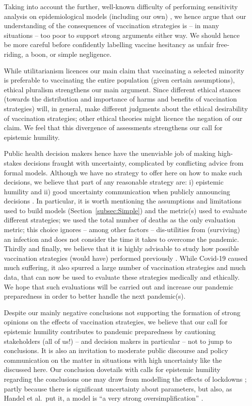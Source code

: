 \documentclass[a4paper,12pt]{article}
\begin{document}
Taking into account the further, well-known difficulty of performing sensitivity analysis on epidemiological models (including our own) \cite{Edeling2021}, we hence argue that our understanding of the consequences of vaccination strategies is -- in many situations -- too poor to support strong arguments either way. We should hence be more careful before confidently labelling vaccine hesitancy as unfair free-riding, a boon, or simple negligence. 

While utilitarianism licences our main claim that vaccinating a selected minority is preferable to vaccinating the entire population (given certain assumptions), ethical pluralism strengthens our main argument. Since different ethical stances (towards the distribution and importance of harms and benefits of vaccination strategies) will, in general, make different judgments about the ethical desirability of vaccination strategies; other ethical theories might licence the negation of our claim. We feel that this divergence of assessments strengthens our call for epistemic humility.

Public health decision makers hence have the unenviable job of making high-stakes decisions fraught with uncertainty, complicated by conflicting advice from formal models. Although we have no strategy to offer here on how to make such decisions, we believe that part of any reasonable strategy are: i) epistemic humility and ii) good uncertainty communication when publicly announcing decisions \cite{Nutbeam2020,Intemann2023,Nguyen2024,Friedman2023,OjeaQuintana2021}. In particular, it is worth mentioning the assumptions and limitations used to build models (Section~\ref{subsec:Simple}) and the metric(s) used to evaluate different strategies; we used the total number of deaths as the only evaluation metric; this choice ignores -- among other factors -- dis-utilities from (surviving) an infection and does not consider the time it takes to overcome the pandemic. Thirdly and finally, we believe that it is highly advisable to study how possible vaccination strategies (would have) performed previously \cite{Thompson2013}. While Covid-19 caused much suffering, it also spurred a large number of vaccination strategies and much data, that can now be used to evaluate these strategies medically and ethically. We hope that such evaluations will be carried out and increase our pandemic preparedness in order to better handle the next pandemic(s).

Despite our mainly negative conclusions not supporting the formation of strong opinions on the effects of vaccination strategies, we believe that our call for epistemic humility contributes to pandemic preparedness by cautioning stakeholders (all of us!) -- and decision makers in particular -- not to jump to conclusions. It is also an invitation to moderate public discourse and policy communication on the matter in situations with high uncertainty like the discussed here. Our conclusion dovetails with calls for epistemic humility regarding the conclusions one may draw from modelling the effects of lockdowns \cite[Chapter~3]{Winsberg2024}; partly because there is significant uncertainty about parameters, but also, as Handel et al.\ put it, a model is ``a very strong oversimplification'' \cite[P.\ 835]{Handel2007}.
\end{document}
